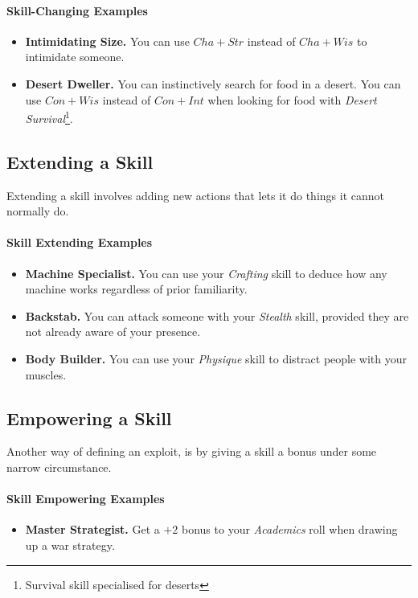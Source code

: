 \paragraph{Skill-Changing Examples}
\begin{itemize}
    \item \textbf{Intimidating Size.} You can use $Cha+Str$ instead of $Cha+Wis$ to intimidate someone.
    \item \textbf{Desert Dweller.} You can instinctively search for food in a desert. You can use $Con+Wis$ instead of $Con+Int$ when looking for food with \textit{Desert Survival}\footnote{Survival skill specialised for deserts}.
\end{itemize}

\subsection{Extending a Skill}
Extending a skill involves adding new actions that lets it do things it cannot normally do.

\paragraph{Skill Extending Examples}
\begin{itemize}
    \item \textbf{Machine Specialist.} You can use your \textit{Crafting} skill to deduce how any machine works regardless of prior familiarity.
    \item \textbf{Backstab.} You can attack someone with your \textit{Stealth} skill, provided they are not already aware of your presence.
    \item \textbf{Body Builder.} You can use your \textit{Physique} skill to distract people with your muscles.
\end{itemize}

\subsection{Empowering a Skill}
Another way of defining an exploit, is by giving a skill a bonus under some narrow circumstance.

\paragraph{Skill Empowering Examples}
\begin{itemize}
    \item \textbf{Master Strategist.} Get a $+2$ bonus to your \textit{Academics} roll when drawing up a war strategy.
\end{itemize}

